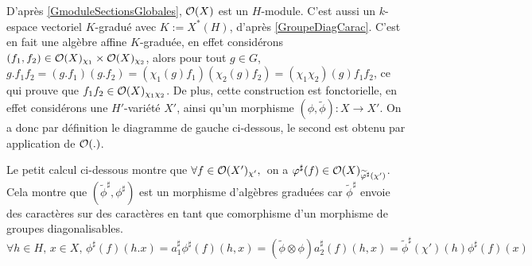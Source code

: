 D'après \ref{GmoduleSectionsGlobales}, $\mathcal{O}(X)$ est un $H$-module. C'est aussi un $k$-espace vectoriel $K$-gradué avec $K:=X^*(H)$, d'après \ref{GroupeDiagCarac}. C'est en fait une algèbre affine $K$-graduée, en effet considérons $(f_1, f_2)\in \mathcal{O}(X)_{\chi_1}\times \mathcal{O}(X)_{\chi_2}$, alors pour tout $g\in G$, $g.f_1f_2=(g.f_1)(g.f_2)=(\chi_1(g)f_1)(\chi_2(g)f_2)=(\chi_1\chi_2)(g)f_1f_2$, ce qui prouve que $f_1f_2\in \mathcal{O}(X)_{\chi_1\chi_2}$. De plus, cette construction est fonctorielle, en effet considérons une $H'$-variété $X'$, ainsi qu'un morphisme $(\phi,\widetilde{\phi}):X\rightarrow X'$. On a donc par définition le diagramme de gauche ci-dessous, le second est obtenu par application de $\mathcal{O}(.)$.

\begin{multicols}{2}
	\begin{center}
	\end{center}

	\columnbreak
	\begin{center}
	\end{center}
\end{multicols}

Le petit calcul ci-dessous montre que $\forall f\in \mathcal{O}(X')_{\chi'},\,$ on a $\varphi^\sharp(f)\in \mathcal{O}(X)_{\widetilde{\varphi}^\sharp(\chi')}$. Cela montre que $(\widetilde{\phi}^\sharp,\phi^\sharp)$ est un morphisme d'algèbres graduées car $\widetilde{\phi}^\sharp$ envoie des caractères sur des caractères en tant que comorphisme d'un morphisme de groupes diagonalisables. 
$$\forall h\in H,\,x\in X,\, \phi^\sharp(f)(h.x)=a_1^\sharp\phi^\sharp(f)(h, x)=(\widetilde{\phi}\otimes\phi)a_2^\sharp(f)(h,x)=\widetilde{\phi}^\sharp(\chi')(h)\phi^\sharp(f)(x)$$ 

